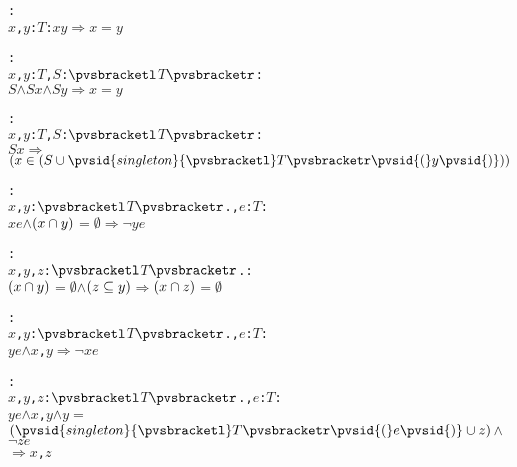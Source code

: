 \begin{alltt}
  : 
     \pvsid{(}\(x\), \(y\): \(T\)\pvsid{)}: \pvsid{(}\(x\)\pvsid{)}\pvsid{(}\(y\)\pvsid{)} \(\Rightarrow\) \(x\) \(=\) \(y\)\vspace*{\pvsdeclspacing}

  : 
     \pvsid{(}\(x\), \(y\): \(T\), \(S\): \({\pvsbracketl}\)\(T\)\({\pvsbracketr}\)\pvsid{)}:
      \pvsid{(}\(S\)\pvsid{)} \(\wedge\) \(S\)\pvsid{(}\(x\)\pvsid{)} \(\wedge\) \(S\)\pvsid{(}\(y\)\pvsid{)} \(\Rightarrow\) \(x\) \(=\) \(y\)\vspace*{\pvsdeclspacing}

  : 
     \pvsid{(}\(x\), \(y\): \(T\), \(S\): \({\pvsbracketl}\)\(T\)\({\pvsbracketr}\)\pvsid{)}:
      \(S\)\pvsid{(}\(x\)\pvsid{)} \(\Rightarrow\) \(\setsothermembertwofn{x}{\setsotheruniontwofn{S}{\pvsid{singleton}{\pvsbracketl}T{\pvsbracketr}\pvsid{(}y\pvsid{)}}}\)\vspace*{\pvsdeclspacing}

  : 
     \pvsid{(}\(x\), \(y\): \({\pvsbracketl}\)\(T\)\({\pvsbracketr}\)., \(e\): \(T\)\pvsid{)}:
      \(x\)\pvsid{(}\(e\)\pvsid{)} \(\wedge\) \(\setsotherintersectiontwofn{x}{y}\) \(=\) \({\emptyset}\) \(\Rightarrow\) \(\neg\) \(y\)\pvsid{(}\(e\)\pvsid{)}\vspace*{\pvsdeclspacing}

  : 
     \pvsid{(}\(x\), \(y\), \(z\): \({\pvsbracketl}\)\(T\)\({\pvsbracketr}\).\pvsid{)}:
      \(\setsotherintersectiontwofn{x}{y}\) \(=\) \({\emptyset}\) \(\wedge\) \(\setsothersubsetothertwofn{z}{y}\) \(\Rightarrow\) \(\setsotherintersectiontwofn{x}{z}\) \(=\) \({\emptyset}\)\vspace*{\pvsdeclspacing}

  : 
     \pvsid{(}\(x\), \(y\): \({\pvsbracketl}\)\(T\)\({\pvsbracketr}\)., \(e\): \(T\)\pvsid{)}:
      \(y\)\pvsid{(}\(e\)\pvsid{)} \(\wedge\) \pvsid{(}\(x\), \(y\)\pvsid{)} \(\Rightarrow\) \(\neg\) \pvsid{(}\(x\)\pvsid{(}\(e\)\pvsid{)}\pvsid{)}\vspace*{\pvsdeclspacing}

  : 
     \pvsid{(}\(x\), \(y\), \(z\): \({\pvsbracketl}\)\(T\)\({\pvsbracketr}\)., \(e\): \(T\)\pvsid{)}:
      \(y\)\pvsid{(}\(e\)\pvsid{)} \(\wedge\) \pvsid{(}\(x\), \(y\)\pvsid{)} \(\wedge\) \(y\) \(=\) \(\setsotheruniontwofn{\pvsid{singleton}{\pvsbracketl}T{\pvsbracketr}\pvsid{(}e\pvsid{)}}{z}\) \(\wedge\) \(\neg\) \pvsid{(}\(z\)\pvsid{(}\(e\)\pvsid{)}\pvsid{)}
       \(\Rightarrow\) \pvsid{(}\(x\), \(z\)\pvsid{)}\vspace*{\pvsdeclspacing}


\end{alltt}
